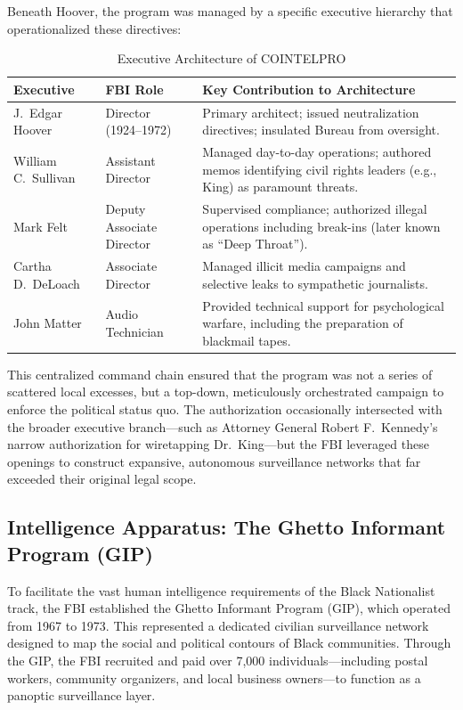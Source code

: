 \documentclass[12pt,openany]{book}
\begin{document}
Beneath Hoover, the program was managed by a specific executive hierarchy that operationalized these directives:

\begin{table}[htbp]
\centering
\small
\caption{Executive Architecture of COINTELPRO}
\label{tab:cointelpro_executives}
\begin{tabular}{>{\raggedright}p{3cm} >{\raggedright}p{4cm} >{\raggedright\arraybackslash}p{7cm}}
\toprule
\textbf{Executive} & \textbf{FBI Role} & \textbf{Key Contribution to Architecture} \\
\midrule
J.\ Edgar Hoover & Director (1924--1972) & Primary architect; issued neutralization directives; insulated Bureau from oversight. \\
William C.\ Sullivan & Assistant Director & Managed day-to-day operations; authored memos identifying civil rights leaders (e.g., King) as paramount threats. \\
Mark Felt & Deputy Associate Director & Supervised compliance; authorized illegal operations including break-ins (later known as ``Deep Throat''). \\
Cartha D.\ DeLoach & Associate Director & Managed illicit media campaigns and selective leaks to sympathetic journalists. \\
John Matter & Audio Technician & Provided technical support for psychological warfare, including the preparation of blackmail tapes. \\
\bottomrule
\end{tabular}
\end{table}

This centralized command chain ensured that the program was not a series of scattered local excesses, but a top-down, meticulously orchestrated campaign to enforce the political status quo. The authorization occasionally intersected with the broader executive branch---such as Attorney General Robert F.\ Kennedy's narrow authorization for wiretapping Dr.\ King---but the FBI leveraged these openings to construct expansive, autonomous surveillance networks that far exceeded their original legal scope.

\subsection{Intelligence Apparatus: The Ghetto Informant Program (GIP)}

To facilitate the vast human intelligence requirements of the Black Nationalist track, the FBI established the Ghetto Informant Program (GIP), which operated from 1967 to 1973. This represented a dedicated civilian surveillance network designed to map the social and political contours of Black communities. Through the GIP, the FBI recruited and paid over 7,000 individuals---including postal workers, community organizers, and local business owners---to function as a panoptic surveillance layer.
\end{document}
